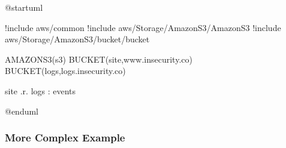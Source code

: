 \documentclass[letterpaper,10pt,english]{sphinxmanual}
\begin{document}
\begin{sphinxVerbatim}[commandchars=\\\{\},numbers=left,firstnumber=1,stepnumber=1]
@startuml

!include \PYGZlt{}aws/common\PYGZgt{}
!include \PYGZlt{}aws/Storage/AmazonS3/AmazonS3\PYGZgt{}
!include \PYGZlt{}aws/Storage/AmazonS3/bucket/bucket\PYGZgt{}

AMAZONS3(s3) \PYGZob{}
    BUCKET(site,www.insecurity.co)
    BUCKET(logs,logs.insecurity.co)
\PYGZcb{}

site .r.\PYGZgt{} logs : events

@enduml
\end{sphinxVerbatim}


\subsubsection{More Complex Example}
\label{\detokenize{PlantUMLSpriteLibraries/plantuml_sprites:more-complex-example}}
\begin{figure}[htbp]
\centering

\end{figure}
\end{document}
